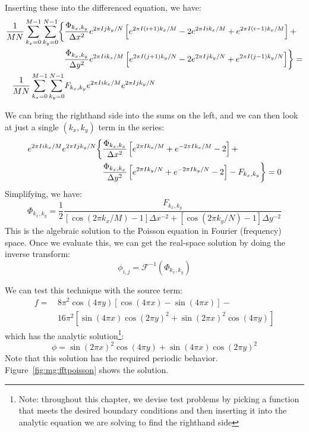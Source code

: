 Inserting these into the differenced equation, we have:
\begin{align}
\frac{1}{MN}\sum_{k_x=0}^{M-1}\sum_{k_y=0}^{N-1}
\biggl \{
&\frac{\Phi_{k_x,k_y}}{\Delta x^2} e^{2\pi I j k_y/N}
  \left [ e^{2\pi I (i+1) k_x/M} -2 e^{2\pi I i k_x/M} +
         e^{2\pi I (i-1) k_x/M} \right ] + \nonumber \\
&\frac{\Phi_{k_x,k_y}}{\Delta y^2} e^{2\pi I i k_x/M}
  \left [ e^{2\pi I (j+1) k_y/N} -2 e^{2\pi I j k_y/N} +
         e^{2\pi I (j-1) k_y/N} \right ] \biggr \} = \nonumber \\
\frac{1}{MN}\sum_{k_x=0}^{M-1}\sum_{k_y=0}^{N-1}
 & F_{k_x,k_y} e^{2\pi I i k_x/M} e^{2\pi I j k_y/N}
\end{align}

We can bring the righthand side into the sums on the left, and we can
then look at just a single $(k_x,k_y)$ term in the series:
\begin{align}
  e^{2\pi I i k_x/M} e^{2\pi I j k_y/N}
  \biggl \{
  &\frac{\Phi_{k_x,k_x}}{\Delta x^2}
  \left [e^{2\pi I k_x/M} + e^{-2\pi I k_x/M} - 2 \right ] + \nonumber \\
  &\frac{\Phi_{k_x,k_x}}{\Delta y^2}
  \left [e^{2\pi I k_y/N} + e^{-2\pi I k_y/N} - 2 \right ] 
  - F_{k_x,k_y}
  \biggr \} = 0
\end{align}
Simplifying, we have:
\begin{equation}
  \Phi_{k_x,k_y} = \frac{1}{2}\frac{F_{k_x,k_y}}
      {\left [\cos(2\pi k_x/M) - 1 \right ] \Delta x^{-2} +
        \left [\cos(2\pi k_y/N) - 1 \right ] \Delta y^{-2}}
      \label{eq:FFTsol}
\end{equation}
This is the algebraic solution to the Poisson equation in Fourier (frequency)
space.  Once we evaluate this, we can get the real-space solution
by doing the inverse transform:
\begin{equation}
\phi_{i,j} = \mathcal{F}^{-1}(\Phi_{k_x,k_y})
\end{equation}


We can test this technique with the source term:
\begin{align}
f =\, & 8\pi^2\cos(4\pi y) \left [\cos(4\pi x) - \sin(4\pi x) \right ] - \nonumber \\
    & 16\pi^2 \left [ \sin(4\pi x)\cos(2\pi y)^2 + \sin(2\pi x)^2 \cos(4\pi y) \right ]
    \label{eq:mg:fftsource}
\end{align}
which has the analytic solution\footnote{Note: throughout this
chapter, we devise test problems by picking a function
that meets the desired boundary conditions and then inserting
it into the analytic equation we are solving to find the righthand
side}:
\begin{equation}
\phi = \sin(2\pi x)^2 \cos(4\pi y) + \sin(4\pi x)\cos(2\pi y)^2
\end{equation}
Note that this solution has the required periodic behavior.
Figure~\ref{fig:mg:fftpoisson} shows the solution.

